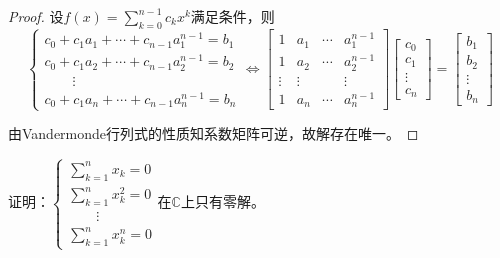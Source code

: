                 \begin{proof}
                    设$f(x)=\sum\limits_{k=0}^{n-1}c_k x^k$满足条件，则
                    \begin{equation*}
                        \begin{cases}
                            c_0+c_1 a_1+\cdots+c_{n-1}a_1^{n-1}=b_1 \\
                            c_0+c_1 a_2+\cdots+c_{n-1}a_2^{n-1}=b_2 \\
                            \qquad\vdots \\
                            c_0+c_1 a_n+\cdots+c_{n-1}a_n^{n-1}=b_n
                        \end{cases}
                        \Leftrightarrow\begin{bmatrix}1&a_1&\cdots&a_1^{n-1}\\1&a_2&\cdots&a_2^{n-1}\\\vdots&\vdots&&\vdots\\1&a_n&\cdots&a_n^{n-1}\end{bmatrix}\begin{bmatrix}c_0\\c_1\\\vdots\\c_n\end{bmatrix}= \begin{bmatrix}b_1\\b_2\\\vdots\\b_n\end{bmatrix}
                    \end{equation*}

                    由Vandermonde行列式的性质知系数矩阵可逆，故解存在唯一。
                \end{proof}

                \begin{example}
                    证明：$\begin{cases}\sum_{k=1}^n x_k=0 \\\sum_{k=1}^n x_k^2=0\\\qquad\vdots \\\sum_{k=1}^n x_k^n=0\end{cases}$在$\mathbb{C}$上只有零解。
                \end{example}

